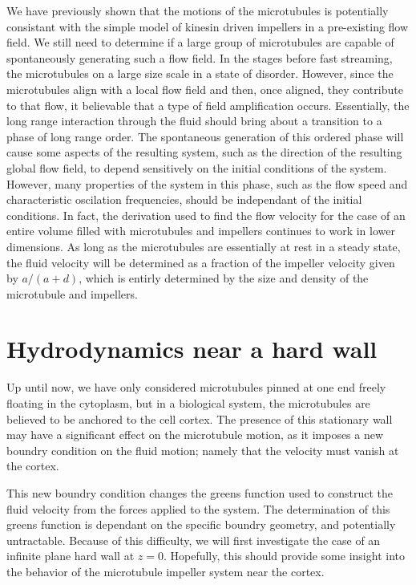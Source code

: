 \documentclass[11pt]{ucthesis}
\begin{document}
We have previously shown that the motions of the microtubules is potentially consistant with the simple model of kinesin driven impellers in a pre-existing flow field. We still need to determine if a large group of microtubules are capable of spontaneously generating such a flow field.
In the stages before fast streaming, the microtubules on a large size scale in a state of disorder. However, since the microtubules align with a local flow field and then, once aligned, they contribute to that flow, it believable that a type of field amplification occurs.
Essentially, the long range interaction through the fluid should bring about a transition to a phase of long range order.
The spontaneous generation of this ordered phase will cause some aspects of the resulting system, such as the direction of the resulting global flow field, to depend sensitively on the initial conditions of the system.
However, many properties of the system in this phase, such as the flow speed and characteristic oscilation frequencies, should be independant of the initial conditions.
In fact, the derivation used to find the flow velocity for the case of an entire volume filled with microtubules and impellers continues to work in lower dimensions.
As long as the microtubules are essentially at rest in a steady state, the fluid velocity will be determined as a fraction of the impeller velocity given by $a/(a+d)$, which is entirly determined by the size and density of the microtubule and impellers.

\section{Hydrodynamics near a hard wall}
Up until now, we have only considered microtubules pinned at one end freely floating in the cytoplasm, but in a biological system, the microtubules are believed to be anchored to the cell cortex. 
The presence of this stationary wall may have a significant effect on the microtubule motion, as it imposes a new boundry condition on the fluid motion; namely that the velocity must vanish at the cortex.


This new boundry condition changes the greens function used to construct the fluid velocity from the forces applied to the system. The determination of this greens function is dependant on the specific boundry geometry, and potentially untractable.
Because of this difficulty, we will first investigate the case of an infinite plane hard wall at $z=0$. Hopefully, this should provide some insight into the behavior of the microtubule impeller system near the cortex.
\end{document}
